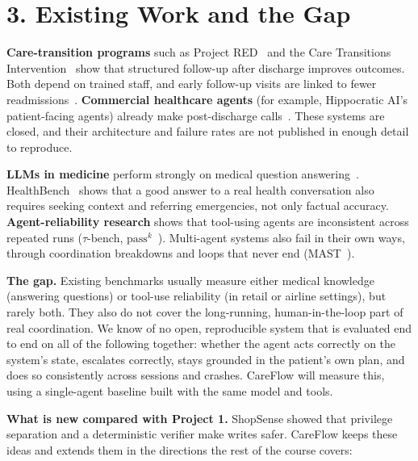 \documentclass[11pt,a4paper]{article}
\begin{document}
\section*{3. Existing Work and the Gap}

\textbf{Care-transition programs} such as Project RED~\cite{red} and the Care Transitions Intervention~\cite{coleman} show that structured follow-up after discharge improves outcomes. Both depend on trained staff, and early follow-up visits are linked to fewer readmissions~\cite{hernandez}. \textbf{Commercial healthcare agents} (for example, Hippocratic AI's patient-facing agents) already make post-discharge calls~\cite{commercial}. These systems are closed, and their architecture and failure rates are not published in enough detail to reproduce.

\textbf{LLMs in medicine} perform strongly on medical question answering~\cite{medpalm}. HealthBench~\cite{healthbench} shows that a good answer to a real health conversation also requires seeking context and referring emergencies, not only factual accuracy. \textbf{Agent-reliability research} shows that tool-using agents are inconsistent across repeated runs ($\tau$-bench, $\mathrm{pass}^k$~\cite{taubench}). Multi-agent systems also fail in their own ways, through coordination breakdowns and loops that never end (MAST~\cite{mast}).

\textbf{The gap.} Existing benchmarks usually measure either medical knowledge (answering questions) or tool-use reliability (in retail or airline settings), but rarely both. They also do not cover the long-running, human-in-the-loop part of real coordination. We know of no open, reproducible system that is evaluated end to end on all of the following together: whether the agent acts correctly on the system's state, escalates correctly, stays grounded in the patient's own plan, and does so consistently across sessions and crashes. CareFlow will measure this, using a single-agent baseline built with the same model and tools.

\textbf{What is new compared with Project 1.} ShopSense showed that privilege separation and a deterministic verifier make writes safer. CareFlow keeps these ideas and extends them in the directions the rest of the course covers:
\end{document}
